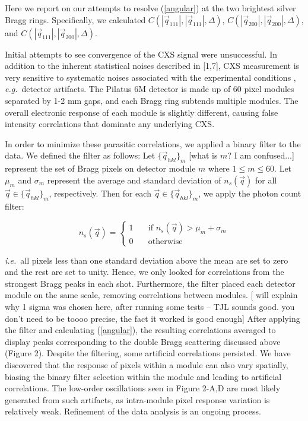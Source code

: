 \documentclass [11pt,fleqn]{article}
\begin{document}
Here we report on our attempts to resolve (\ref{angular}) at the two brightest silver Bragg rings. Specifically, we calculated $C (|\vec{q}_{111}|,|\vec{q}_{111}|, \Delta  )$, $C (|\vec{q}_{200}|,|\vec{q}_{200}|, \Delta  )$, and $C (|\vec{q}_{111}|,|\vec{q}_{200}|, \Delta  )$. 

Initial attempts to see convergence of the CXS signal were unsuccessful. In addition to the inherent statistical noises described in [1,7], CXS measurement  is very sensitive to systematic noises associated with the experimental conditions \cite{Kam:1981ua}, \textit{e.g.}~detector artifacts. The Pilatus 6M detector is made up of 60 pixel modules separated by 1-2 mm gaps, and each Bragg ring subtends multiple modules. The overall electronic response of each module is slightly different, causing false intensity correlations that dominate any underlying CXS. 

In order to minimize these parasitic correlations, we applied a binary filter to the data. We defined the filter as follows: Let $\{ \vec{q}_{hkl} \}_{m}$ [what is $m$? I am confused...] represent the set of Bragg pixels on detector module $m$ where $1 \leq m \leq 60$. Let $\mu_m$ and $\sigma_m$ represent the average and standard deviation of $n_{s}(\vec{q})$  for all $\vec{q} \in \{ \vec{q}_{hkl} \}_{m} $, respectively. Then for each $\vec{q} \in \{ \vec{q}_{hkl} \}_{m} $, we apply the photon count filter:

\[  n_{s}(\vec{q} ) = 
 \begin{cases} 
   1 & \quad \text{if } n_{s}(\vec{q} ) > \mu_m +  \sigma_m\\
   0 & \quad \text{otherwise} 
 \end{cases} 
 \]

\textit{i.e.}~all pixels less than one standard deviation above the mean are set to zero and the rest are set to unity. Hence, we only looked for correlations from the strongest Bragg peaks in each shot. Furthermore, the filter placed each detector module on the same scale, removing correlations between modules. [  will explain why 1 sigma was chosen here, after running some tests -- TJL sounds good. you don't need to be toooo precise, the fact it worked is good enough]  After applying the filter and calculating (\ref{angular}), the resulting correlations averaged to display peaks corresponding to the double Bragg scattering discussed above (Figure 2). Despite the filtering, some artificial correlations persisted. We have discovered that the response of pixels within a module can also vary spatially, biasing the binary filter selection within the module and leading to artificial correlations. The low-order oscillations seen in Figure 2-A,D are most likely generated from such artifacts, as intra-module pixel response variation is relatively weak. Refinement of the data analysis is an ongoing process.
\end{document}
